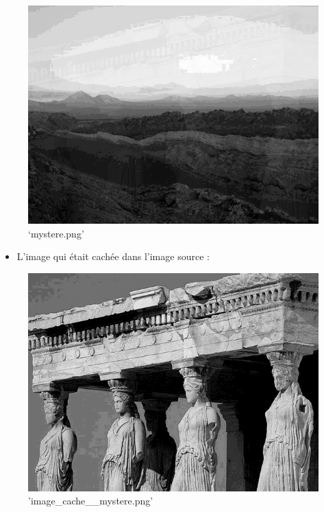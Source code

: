 \documentclass[11pt]{article}
\makeatletter
\def\maxwidth{\ifdim\Gin@nat@width>\linewidth\linewidth
    \else\Gin@nat@width\fi}
\let\Oldincludegraphics\includegraphics
\renewcommand{\includegraphics}[1]{\Oldincludegraphics[width=.8\maxwidth]{#1}}
\providecommand{\tightlist}{%
      \setlength{\itemsep}{0pt}\setlength{\parskip}{0pt}}
\makeatother
\begin{document}
\begin{figure}
\centering
\includegraphics{mystere.png}
\caption{`mystere.png'}
\end{figure}

\begin{itemize}
\tightlist
\item
  L'image qui était cachée dans l'image source :
\end{itemize}

\begin{figure}
\centering
\includegraphics{image_cache_mystere.png}
\caption{'image\_cache\_\_mystere.png'}
\end{figure}
\end{document}
